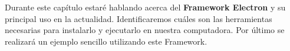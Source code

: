 
Durante este capítulo estaré hablando acerca del \textbf{Framework Electron} y su principal uso en la actualidad. Identificaremos cuáles son las herramientas necesarias para instalarlo y ejecutarlo en nuestra computadora. Por último se realizará un ejemplo sencillo utilizando este Framework.


